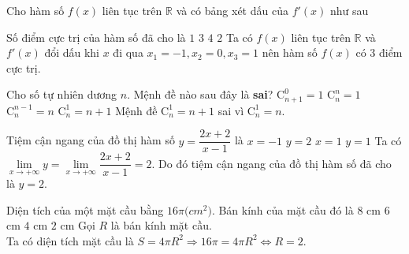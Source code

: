 \begin{ex}%
Cho hàm số $f(x)$ liên tục trên $\mathbb{R}$ và có bảng xét dấu của $f'(x)$ như sau
\begin{center}
\end{center}
Số điểm cực trị của hàm số đã cho là
\choice
{$1$}
{\True $3$}
{$4$}
{$2$}
\loigiai
{
Ta có $f(x)$ liên tục trên $\mathbb{R}$ và $f'(x)$ đổi dấu khi $x$ đi qua $x_1=-1, x_2=0, x_3=1$ nên hàm số $f(x)$ có 3 điểm cực trị.
}
\end{ex}

\begin{ex}%
Cho số tự nhiên dương $n$. Mệnh đề nào sau đây là \textbf{sai}?
\choice
{$\mathrm{C}_{n+1}^0=1$}
{$\mathrm{C}_n^n=1$}
{$\mathrm{C}_n^{n-1}=n$}
{\True $\mathrm{C}_n^1=n+1$}
\loigiai
{
Mệnh đề $\mathrm{C}_n^1=n+1$ sai vì $\mathrm{C}_n^1=n$.
}
\end{ex}

\begin{ex}%
Tiệm cận ngang của đồ thị hàm số $y=\dfrac{2x+2}{x-1}$ là
\choice
{$x=-1$}
{\True $y=2$}
{$x=1$}
{$y=1$}
\loigiai
{
Ta có $\lim\limits_{x \to +\infty}y=\lim\limits_{x \to +\infty}\dfrac{2x+2}{x-1}=2$. Do đó tiệm cận ngang của đồ thị hàm số đã cho là $y=2$.
}
\end{ex}

\begin{ex}%
Diện tích của một mặt cầu bằng $16\pi($$ cm^2)$. Bán kính của mặt cầu đó là
\choice
{$8$ cm}
{$6$ cm}
{$4$ cm}
{\True $2$ cm}
\loigiai
{
Gọi $R$ là bán kính mặt cầu.\\
Ta có diện tích mặt cầu là $S=4\pi R^2 \Rightarrow 16\pi =4\pi R^2 \Leftrightarrow R=2$.
}
\end{ex}

